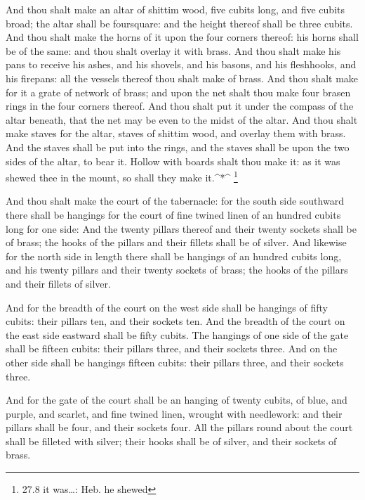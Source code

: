  And thou shalt make an altar of shittim wood, five cubits
long, and five cubits broad; the altar shall be foursquare: and the
height thereof shall be three cubits.  And thou shalt make
the horns of it upon the four corners thereof: his horns shall be of the
same: and thou shalt overlay it with brass.  And thou shalt
make his pans to receive his ashes, and his shovels, and his basons, and
his fleshhooks, and his firepans: all the vessels thereof thou shalt
make of brass.  And thou shalt make for it a grate of
network of brass; and upon the net shalt thou make four brasen rings in
the four corners thereof.  And thou shalt put it under the
compass of the altar beneath, that the net may be even to the midst of
the altar.  And thou shalt make staves for the altar, staves
of shittim wood, and overlay them with brass.  And the
staves shall be put into the rings, and the staves shall be upon the two
sides of the altar, to bear it.  Hollow with boards shalt
thou make it: as it was shewed thee in the mount, so shall they make
it.\^{}*\^{} \footnote{27.8 it was\ldots: Heb. he shewed}

 And thou shalt make the court of the tabernacle: for the
south side southward there shall be hangings for the court of fine
twined linen of an hundred cubits long for one side:  And
the twenty pillars thereof and their twenty sockets shall be of brass;
the hooks of the pillars and their fillets shall be of silver.
 And likewise for the north side in length there shall be
hangings of an hundred cubits long, and his twenty pillars and their
twenty sockets of brass; the hooks of the pillars and their fillets of
silver.

 And for the breadth of the court on the west side shall be
hangings of fifty cubits: their pillars ten, and their sockets ten.
 And the breadth of the court on the east side eastward
shall be fifty cubits.  The hangings of one side of the
gate shall be fifteen cubits: their pillars three, and their sockets
three.  And on the other side shall be hangings fifteen
cubits: their pillars three, and their sockets three.

 And for the gate of the court shall be an hanging of
twenty cubits, of blue, and purple, and scarlet, and fine twined linen,
wrought with needlework: and their pillars shall be four, and their
sockets four.  All the pillars round about the court shall
be filleted with silver; their hooks shall be of silver, and their
sockets of brass.

